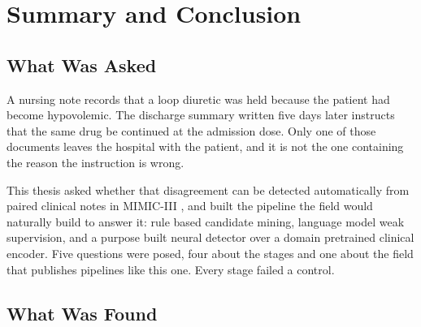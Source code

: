 %
%
%
%

\chapter{Summary and Conclusion}
\label{ch:conclusion}

\section{What Was Asked}
\label{sec:conc-asked}

A nursing note records that a loop diuretic was held because the patient had
become hypovolemic. The discharge summary written five days later instructs that
the same drug be continued at the admission dose. Only one of those documents
leaves the hospital with the patient, and it is not the one containing the
reason the instruction is wrong.

This thesis asked whether that disagreement can be detected automatically from
paired clinical notes in MIMIC-III \citep{johnson2016mimic}, and built the
pipeline the field would naturally build to
answer it: rule based candidate mining, language model weak supervision, and a
purpose built neural detector over a domain pretrained clinical encoder. Five
questions were posed, four about the stages and one about the field that
publishes pipelines like this one. Every stage failed a control.

\section{What Was Found}
\label{sec:conc-found}

